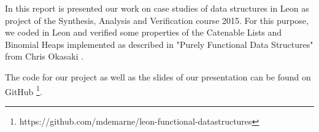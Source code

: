 In this report is presented our work on case studies of data structures in Leon
as project of the Synthesis, Analysis and Verification course 2015.
For this purpose, we coded in Leon and verified some properties of
the Catenable Lists and Binomial Heaps
implemented as described in "Purely Functional Data Structures" from Chris Okasaki
\cite{Okasaki}.

The code for our project as well as the slides of our presentation 
can be found on GitHub
\footnote{https://github.com/mdemarne/leon-functional-datastructures}.
